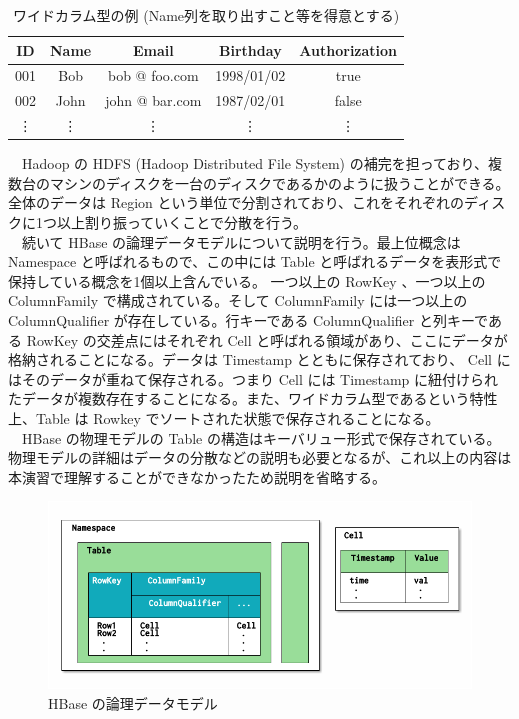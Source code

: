 \documentclass{scrartcl}
\begin{document}
\begin{table}[htbp]
\caption{ワイドカラム型の例 (Name列を取り出すこと等を得意とする)}
\centering
\begin{tabular}{|c|c|c|c|c|}
\hline
ID & Name & Email & Birthday & Authorization\\
\hline
001 & Bob & bob @ foo.com & 1998/01/02 & true\\
002 & John & john @ bar.com & 1987/02/01 & false\\
\vdots & \vdots & \vdots & \vdots & \vdots\\
\hline
\end{tabular}
\end{table}

　Hadoop の HDFS (Hadoop Distributed File System) の補完を担っており、複数台のマシンのディスクを一台のディスクであるかのように扱うことができる。全体のデータは Region という単位で分割されており、これをそれぞれのディスクに1つ以上割り振っていくことで分散を行う。\\
　続いて HBase の論理データモデルについて説明を行う。最上位概念は Namespace と呼ばれるもので、この中には Table と呼ばれるデータを表形式で保持している概念を1個以上含んでいる。 一つ以上の RowKey 、一つ以上の ColumnFamily で構成されている。そして ColumnFamily には一つ以上の ColumnQualifier が存在している。行キーである ColumnQualifier と列キーである RowKey の交差点にはそれぞれ Cell と呼ばれる領域があり、ここにデータが格納されることになる。データは Timestamp とともに保存されており、 Cell にはそのデータが重ねて保存される。つまり Cell には Timestamp に紐付けられたデータが複数存在することになる。また、ワイドカラム型であるという特性上、Table は Rowkey でソートされた状態で保存されることになる。\\
　HBase の物理モデルの Table の構造はキーバリュー形式で保存されている。物理モデルの詳細はデータの分散などの説明も必要となるが、これ以上の内容は本演習で理解することができなかったため説明を省略する。\\

\begin{figure}[htbp]
\centering
\includegraphics[width=.9\linewidth]{hoge2.png}
\caption{HBase の論理データモデル}
\end{figure}
\end{document}
